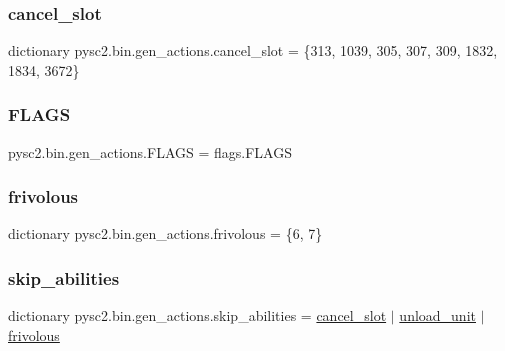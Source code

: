 \subsubsection{\texorpdfstring{cancel\+\_\+slot}{cancel\_slot}}
{\footnotesize\ttfamily dictionary pysc2.\+bin.\+gen\+\_\+actions.\+cancel\+\_\+slot = \{313, 1039, 305, 307, 309, 1832, 1834, 3672\}}

\mbox{\label{namespacepysc2_1_1bin_1_1gen__actions_aefe00fb4c7c7afb7a385c6e5ab636932}} 
\subsubsection{\texorpdfstring{F\+L\+A\+GS}{FLAGS}}
{\footnotesize\ttfamily pysc2.\+bin.\+gen\+\_\+actions.\+F\+L\+A\+GS = flags.\+F\+L\+A\+GS}

\mbox{\label{namespacepysc2_1_1bin_1_1gen__actions_a6737a7178651d41e1d24b7a1c1bb1d28}} 
\subsubsection{\texorpdfstring{frivolous}{frivolous}}
{\footnotesize\ttfamily dictionary pysc2.\+bin.\+gen\+\_\+actions.\+frivolous = \{6, 7\}}

\mbox{\label{namespacepysc2_1_1bin_1_1gen__actions_a0307e2d975de651565c206a6c6a01c8f}} 
\subsubsection{\texorpdfstring{skip\+\_\+abilities}{skip\_abilities}}
{\footnotesize\ttfamily dictionary pysc2.\+bin.\+gen\+\_\+actions.\+skip\+\_\+abilities = \mbox{\hyperlink{namespacepysc2_1_1bin_1_1gen__actions_a1ae1aae9850befe1a62c33fd578801f5}{cancel\+\_\+slot}} $\vert$ \mbox{\hyperlink{namespacepysc2_1_1bin_1_1gen__actions_a6216003b8762b47f8435217866a835dc}{unload\+\_\+unit}} $\vert$ \mbox{\hyperlink{namespacepysc2_1_1bin_1_1gen__actions_a6737a7178651d41e1d24b7a1c1bb1d28}{frivolous}}}

